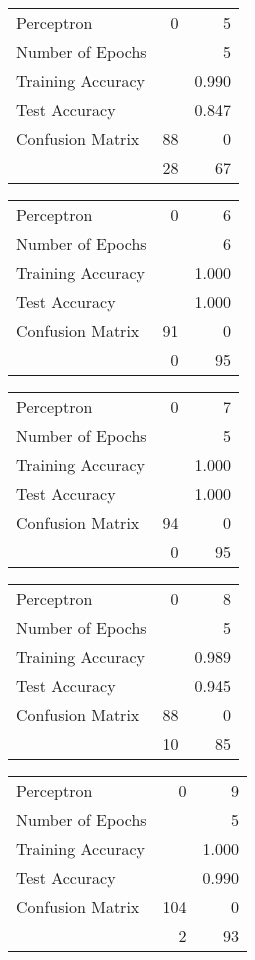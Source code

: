 \documentclass[11pt]{article}
\begin{document}
\begin{minipage}[t]{0.5\textwidth}
\begin{tabular}{|l | r r|}
\hline Perceptron & 0 & 5\\
Number of Epochs & & 5\\
Training Accuracy & & 0.990\\
Test Accuracy & & 0.847\\
Confusion Matrix & 88 & 0\\
 &28 & 67\\ \hline
\end{tabular}
\end{minipage}
\begin{minipage}[t]{0.5\textwidth}
\begin{tabular}{|l | r r|}
\hline Perceptron & 0 & 6\\
Number of Epochs & & 6\\
Training Accuracy & & 1.000\\
Test Accuracy & & 1.000\\
Confusion Matrix & 91 & 0\\
 &0 & 95\\ \hline
\end{tabular}
\end{minipage}
\begin{minipage}[t]{0.5\textwidth}
\begin{tabular}{|l | r r|}
\hline Perceptron & 0 & 7\\
Number of Epochs & & 5\\
Training Accuracy & & 1.000\\
Test Accuracy & & 1.000\\
Confusion Matrix & 94 & 0\\
 &0 & 95\\ \hline
\end{tabular}
\end{minipage}
\begin{minipage}[t]{0.5\textwidth}
\begin{tabular}{|l | r r|}
\hline Perceptron & 0 & 8\\
Number of Epochs & & 5\\
Training Accuracy & & 0.989\\
Test Accuracy & & 0.945\\
Confusion Matrix & 88 & 0\\
 &10 & 85\\ \hline
\end{tabular}
\end{minipage}
\begin{minipage}[t]{0.5\textwidth}
\begin{tabular}{|l | r r|}
\hline Perceptron & 0 & 9\\
Number of Epochs & & 5\\
Training Accuracy & & 1.000\\
Test Accuracy & & 0.990\\
Confusion Matrix & 104 & 0\\
 &2 & 93\\ \hline
\end{tabular}
\end{minipage}
\end{document}
